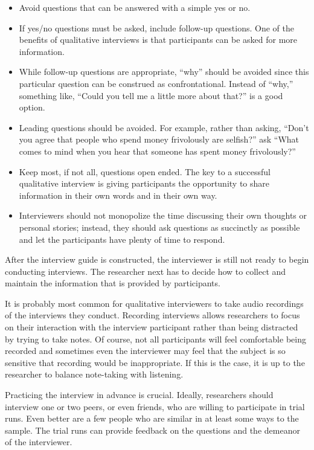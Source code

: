 \begin{itemize}
	\item Avoid questions that can be answered with a simple yes or no.
	
	\item If yes/no questions must be asked, include follow-up questions. One of the benefits of qualitative interviews is that participants can be asked for more information.

	\item While follow-up questions are appropriate, ``why'' should be avoided since this particular question can be construed as confrontational. Instead of ``why,'' something like, ``Could you tell me a little more about that?'' is a good option.

	\item Leading questions should be avoided. For example, rather than asking, ``Don't you agree that people who spend money frivolously are selfish?'' ask ``What comes to mind when you hear that someone has spent money frivolously?''

	\item Keep most, if not all, questions open ended. The key to a successful qualitative interview is giving participants the opportunity to share information in their own words and in their own way.
	
	\item Interviewers should not monopolize the time discussing their own thoughts or personal stories; instead, they should ask questions as succinctly as possible and let the participants have plenty of time to respond.
\end{itemize}

After the interview guide is constructed, the interviewer is still not ready to begin conducting interviews. The researcher next has to decide how to collect and maintain the information that is provided by participants. 

It is probably most common for qualitative interviewers to take audio recordings of the interviews they conduct. Recording interviews allows researchers to focus on their interaction with the interview participant rather than being distracted by trying to take notes. Of course, not all participants will feel comfortable being recorded and sometimes even the interviewer may feel that the subject is so sensitive that recording would be inappropriate. If this is the case, it is up to the researcher to balance note-taking with listening. 

Practicing the interview in advance is crucial. Ideally, researchers should interview one or two peers, or even friends, who are willing to participate in trial runs. Even better are a few people who are similar in at least some ways to the sample. The trial runs can provide feedback on the questions and the demeanor of the interviewer.

